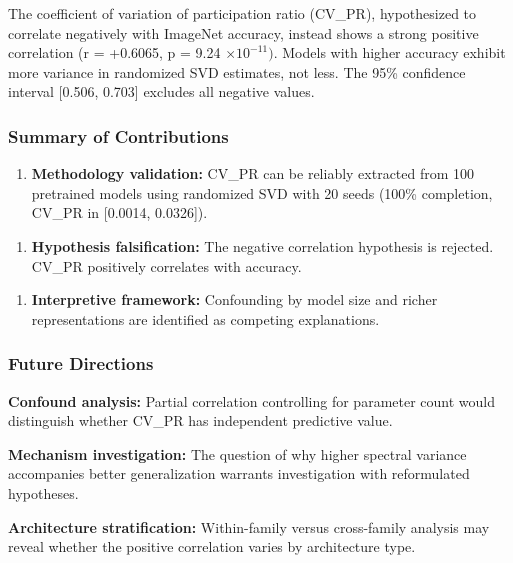 
The coefficient of variation of participation ratio (CV\_PR), hypothesized to correlate negatively with ImageNet accuracy, instead shows a strong positive correlation (r = +0.6065, p = 9.24 $\times 10^{-11})$. Models with higher accuracy exhibit more variance in randomized SVD estimates, not less. The 95\% confidence interval [0.506, 0.703] excludes all negative values.

\subsubsection{Summary of Contributions}

\begin{enumerate}
\item \textbf{Methodology validation:} CV\_PR can be reliably extracted from 100 pretrained models using randomized SVD with 20 seeds (100\% completion, CV\_PR in [0.0014, 0.0326]).
\end{enumerate}

\begin{enumerate}
\item \textbf{Hypothesis falsification:} The negative correlation hypothesis is rejected. CV\_PR positively correlates with accuracy.
\end{enumerate}

\begin{enumerate}
\item \textbf{Interpretive framework:} Confounding by model size and richer representations are identified as competing explanations.
\end{enumerate}

\subsubsection{Future Directions}

\textbf{Confound analysis:} Partial correlation controlling for parameter count would distinguish whether CV\_PR has independent predictive value.

\textbf{Mechanism investigation:} The question of why higher spectral variance accompanies better generalization warrants investigation with reformulated hypotheses.

\textbf{Architecture stratification:} Within-family versus cross-family analysis may reveal whether the positive correlation varies by architecture type.
